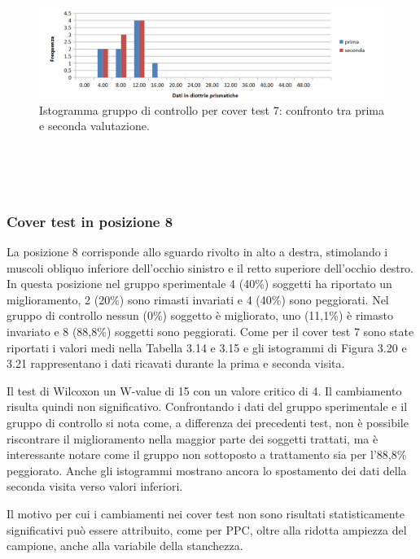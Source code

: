 \\\ \\\
 \begin{figure}[h!]
	\centering
	\includegraphics[scale=0.38]{source/grafici/cover_test_7_giustissimo_non_trattati.png}
	\caption[Istogramma gruppo di controllo per cover test 7]{Istogramma gruppo di controllo per cover test 7: confronto tra prima e seconda valutazione.}
	\label{fig:issuexample}
\end{figure}
\\\ \\\
\subsubsection{Cover test in posizione 8}

La posizione 8 corrisponde allo sguardo rivolto in alto a destra, stimolando i muscoli obliquo inferiore dell’occhio sinistro e il retto superiore dell’occhio destro. In questa posizione nel gruppo sperimentale 4 (40\%) soggetti ha riportato un miglioramento, 2 (20\%) sono rimasti invariati e 4 (40\%) sono peggiorati. Nel gruppo di controllo nessun (0\%) soggetto è migliorato, uno (11,1\%) è rimasto invariato e 8 (88,8\%) soggetti sono peggiorati. Come per il cover test 7 sono state riportati i valori medi nella Tabella 3.14 e 3.15 e gli istogrammi di Figura 3.20 e 3.21 rappresentano i dati ricavati durante la prima e seconda visita.

Il test di Wilcoxon un W-value di 15 con un valore critico di 4. Il cambiamento risulta quindi non significativo. Confrontando i dati del gruppo sperimentale e il gruppo di controllo si nota come, a differenza dei precedenti test, non è possibile riscontrare il miglioramento nella maggior parte dei soggetti trattati, ma è interessante notare come il gruppo non sottoposto a trattamento sia per l’88,8\% peggiorato. Anche gli istogrammi mostrano ancora lo spostamento dei dati della seconda visita verso valori inferiori. 

Il motivo per cui i cambiamenti nei cover test non sono risultati statisticamente significativi può essere attribuito, come per PPC, oltre alla ridotta ampiezza del campione, anche alla variabile della stanchezza.

